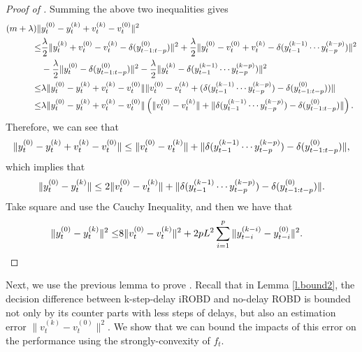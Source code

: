 \begin{proof}[Proof of ]
Summing the above two inequalities gives
\begin{align}
(m+\lambda)\|&y_t^{(0)}-y_t^{(k)}+v_t^{(k)}-v_t^{(0)}\|^2\notag\\
\le&\frac{\lambda}{2}\|y_t^{(k)}+v_t^{(0)}-v_t^{(k)}-\delta(y_{t-1:t-p}^{(0)})\|^2 + \frac{\lambda}{2}\|y_t^{(0)}-v_t^{(0)}+v_t^{(k)}-\delta(y_{t-1}^{(k-1)}\cdots y_{t-p}^{(k-p)})\|^2\notag\\
&- \frac{\lambda}{2}\|y_t^{(0)}-\delta(y_{t-1:t-p}^{(0)})\|^2 - \frac{\lambda}{2}\|y_t^{(k)}-\delta(y_{t-1}^{(k-1)}\cdots y_{t-p}^{(k-p)})\|^2\notag\\
\le&\lambda\|y_t^{(0)}-y_t^{(k)}+v_t^{(k)}-v_t^{(0)}\|\|v_t^{(0)}-v_t^{(k)}+(\delta(y_{t-1}^{(k-1)}\cdots y_{t-p}^{(k-p)})-\delta(y_{t-1:t-p}^{(0)}))\|\notag\\
\le&\lambda\|y_t^{(0)}-y_t^{(k)}+v_t^{(k)}-v_t^{(0)}\|\left(\|v_t^{(0)}-v_t^{(k)}\|+\|\delta(y_{t-1}^{(k-1)}\cdots y_{t-p}^{(k-p)})-\delta(y_{t-1:t-p}^{(0)})\|\right).\notag
\end{align}
Therefore, we can see that
\begin{align}
    \|y_t^{(0)}-y_t^{(k)}+v_t^{(k)}-v_t^{(0)}\|\le\|v_t^{(0)}-v_t^{(k)}\|+\|\delta(y_{t-1}^{(k-1)}\cdots y_{t-p}^{(k-p)})-\delta(y_{t-1:t-p}^{(0)})\|,\notag
\end{align}
which implies that
\begin{align}
     \|y_t^{(0)}-y_t^{(k)}\|\le2\|v_t^{(0)}-v_t^{(k)}\|+\|\delta(y_{t-1}^{(k-1)}\cdots y_{t-p}^{(k-p)})-\delta(y_{t-1:t-p}^{(0)})\|.\notag
\end{align}
Take square and use the Cauchy Inequality, and then we have that
\begin{align}
    \|y_t^{(0)}-y_t^{(k)}\|^2\le&8\|v_t^{(0)}-v_t^{(k)}\|^2+2pL^2\sum_{i=1}^{p}\|y_{t-i}^{(k-i)}-y_{t-i}^{(0)}\|^2.\notag
\end{align}
\end{proof}

Next, we use the previous lemma to prove  . Recall that in Lemma \ref{l.bound2}, the decision difference between k-step-delay iROBD and no-delay ROBD is bounded not only by its counter parts with less steps of delays, but also an estimation error $\|v_t^{(k)}-v_t^{(0)}\|^2$. We show that we can bound the impacts of this error on the performance using the strongly-convexity of $f_t$.

